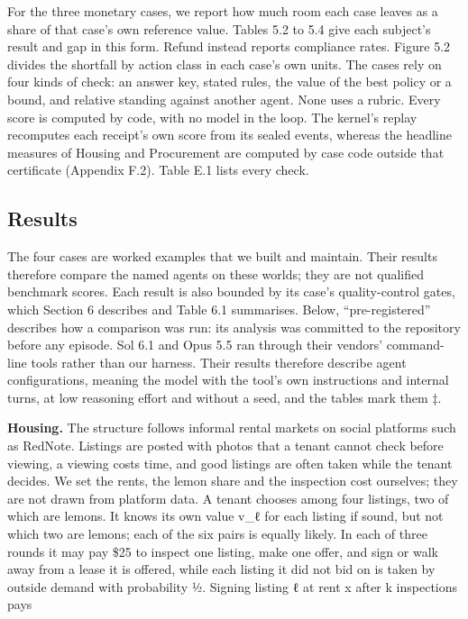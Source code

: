 For the three monetary cases, we report how much room each case leaves as a share of that case's own reference
value. Tables 5.2 to 5.4 give each subject's result and gap in this form. Refund instead reports compliance rates.
Figure 5.2 divides the shortfall by action class in each case's own units. The
cases rely on four kinds of check: an answer key, stated rules, the value of the best policy or a bound, and relative
standing against another agent. None uses a rubric. Every score
is computed by code, with no model in the loop. The kernel's replay recomputes each receipt's own score from its
sealed events, whereas the headline measures of Housing and Procurement are computed by case code outside that
certificate (Appendix F.2). Table E.1 lists every check.

\subsection{Results}\label{results}

The four cases are worked examples that we built and maintain. Their results therefore compare the named agents on
these worlds; they are not qualified benchmark scores. Each result is also bounded by its case's quality-control
gates, which Section 6 describes and Table 6.1 summarises. Below, ``pre-registered'' describes how a comparison was run:
its analysis was committed to the repository before any episode. Sol 6.1 and Opus 5.5 ran through their vendors'
command-line tools rather than our harness. Their results therefore describe agent configurations, meaning the model
with the tool's own instructions and internal turns, at low reasoning effort and without a seed, and the tables mark
them ‡.

\textbf{Housing.} The structure follows informal rental markets on social platforms such as RedNote. Listings are posted
with photos that a tenant cannot check before viewing, a viewing costs time, and good listings are often taken while
the tenant decides. We set the rents, the lemon share and the inspection cost ourselves; they are not drawn from
platform data. A tenant chooses among four listings, two of which are lemons. It knows its own value v\_ℓ for each
listing if sound, but not which two are lemons; each of the six pairs is equally likely. In each of three rounds it
may pay \$25 to inspect one listing, make one offer, and sign or walk away from a lease it is offered, while each
listing it did not bid on is taken by outside demand with probability ½. Signing listing ℓ at rent x after k
inspections pays

